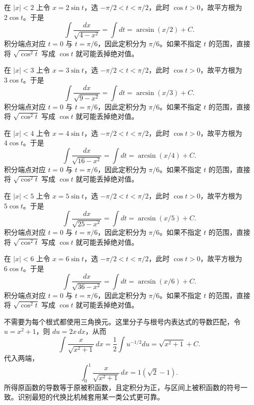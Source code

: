 \documentclass[UTF8,12pt,a4paper,fontset=fandol]{ctexart}
\begin{document}
\begin{solve}\label{ans:c14q14}
在 $|x|<2$ 上令 $x=2\sin t$，选 $-\pi/2<t<\pi/2$，此时 $\cos t>0$，故平方根为 $2\cos t$。于是
\[
\int\frac{dx}{\sqrt{4-x^2}}=\int dt=\arcsin(x/2)+C.
\]
积分端点对应 $t=0$ 与 $t=\pi/6$，因此定积分为 $\pi/6$。如果不指定 $t$ 的范围，直接将 $\sqrt{\cos^2t}$ 写成 $\cos t$ 就可能丢掉绝对值。
\end{solve}

\begin{solve}\label{ans:c14q15}
在 $|x|<3$ 上令 $x=3\sin t$，选 $-\pi/2<t<\pi/2$，此时 $\cos t>0$，故平方根为 $3\cos t$。于是
\[
\int\frac{dx}{\sqrt{9-x^2}}=\int dt=\arcsin(x/3)+C.
\]
积分端点对应 $t=0$ 与 $t=\pi/6$，因此定积分为 $\pi/6$。如果不指定 $t$ 的范围，直接将 $\sqrt{\cos^2t}$ 写成 $\cos t$ 就可能丢掉绝对值。
\end{solve}

\begin{solve}\label{ans:c14q16}
在 $|x|<4$ 上令 $x=4\sin t$，选 $-\pi/2<t<\pi/2$，此时 $\cos t>0$，故平方根为 $4\cos t$。于是
\[
\int\frac{dx}{\sqrt{16-x^2}}=\int dt=\arcsin(x/4)+C.
\]
积分端点对应 $t=0$ 与 $t=\pi/6$，因此定积分为 $\pi/6$。如果不指定 $t$ 的范围，直接将 $\sqrt{\cos^2t}$ 写成 $\cos t$ 就可能丢掉绝对值。
\end{solve}

\begin{solve}\label{ans:c14q17}
在 $|x|<5$ 上令 $x=5\sin t$，选 $-\pi/2<t<\pi/2$，此时 $\cos t>0$，故平方根为 $5\cos t$。于是
\[
\int\frac{dx}{\sqrt{25-x^2}}=\int dt=\arcsin(x/5)+C.
\]
积分端点对应 $t=0$ 与 $t=\pi/6$，因此定积分为 $\pi/6$。如果不指定 $t$ 的范围，直接将 $\sqrt{\cos^2t}$ 写成 $\cos t$ 就可能丢掉绝对值。
\end{solve}

\begin{solve}\label{ans:c14q18}
在 $|x|<6$ 上令 $x=6\sin t$，选 $-\pi/2<t<\pi/2$，此时 $\cos t>0$，故平方根为 $6\cos t$。于是
\[
\int\frac{dx}{\sqrt{36-x^2}}=\int dt=\arcsin(x/6)+C.
\]
积分端点对应 $t=0$ 与 $t=\pi/6$，因此定积分为 $\pi/6$。如果不指定 $t$ 的范围，直接将 $\sqrt{\cos^2t}$ 写成 $\cos t$ 就可能丢掉绝对值。
\end{solve}

\begin{solve}\label{ans:c14q19}
不需要为每个根式都使用三角换元。这里分子与根号内表达式的导数匹配，令 $u=x^2+1$，则 $du=2x\,dx$，从而
\[
\int\frac{x}{\sqrt{x^2+1}}\,dx=\frac12\int u^{-1/2}du=\sqrt{x^2+1}+C.
\]
代入两端，
\[
\int_0^{1}\frac{x}{\sqrt{x^2+1}}\,dx=1(\sqrt2-1).
\]
所得原函数的导数等于原被积函数，且定积分为正，与区间上被积函数的符号一致。识别最短的代换比机械套用某一类公式更可靠。
\end{solve}
\end{document}
